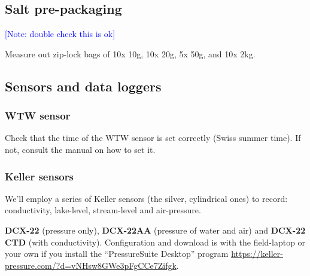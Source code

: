 \documentclass[DIV=15,halfparskip,11pt,headinclude]{scrartcl}
\newcommand{\note}[1]{\textcolor{blue}{[Note: #1]}}
\newcommand{\note}[1]{}
\begin{document}
\subsection{Salt pre-packaging}
\note{double check this is ok}

Measure out zip-lock bags of 10x 10g, 10x 20g, 5x 50g, and 10x 2kg.

\subsection{Sensors and data loggers}
\subsubsection{WTW sensor}

Check that the time of the WTW sensor is set correctly (Swiss summer
time).  If not, consult the manual on how to set it.

\subsubsection{Keller sensors}
\label{s:press-trans}

We'll employ a series of Keller sensors (the silver, cylindrical ones)
to record: conductivity, lake-level, stream-level and air-pressure.

\textbf{DCX-22} (pressure only), \textbf{DCX-22AA} (pressure of water
and air) and \textbf{DCX-22 CTD} (with conductivity).  Configuration
and download is with the field-laptop or your own if you install
the ``PressureSuite Desktop''
program
\url{https://keller-pressure.com/?d=vNHsw8GWe3pFgCCe7Zifgk}.
\end{document}
